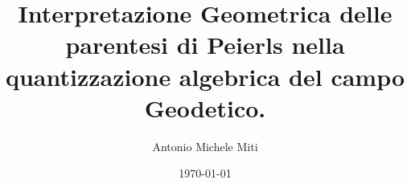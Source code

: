 \documentclass{report}
\title{Interpretazione Geometrica delle parentesi di Peierls nella quantizzazione algebrica del campo Geodetico. }
\author{Antonio Michele Miti}
\date{\today}
\begin{document}
\maketitle



\tableofcontents











\nocite {Abraham1978,Bar2010,Jost2005}

	
	
\end{document}
